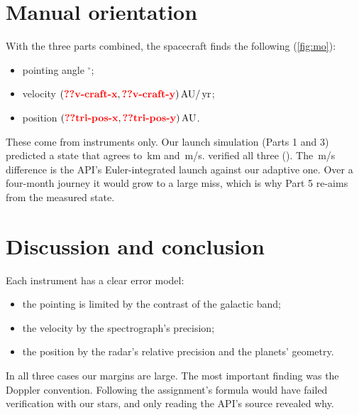 \documentclass[aps,prd,twocolumn,nofootinbib,floatfix,superscriptaddress]{revtex4-2}
\begin{document}

\section{Manual orientation}
With the three parts combined, the spacecraft finds the following (\cref{fig:mo}):
\begin{itemize}
\item pointing angle $^\circ$;
\item velocity $(\val{v-craft-x},\val{v-craft-y})\AU/\yr$;
\item position $(\val{tri-pos-x},\val{tri-pos-y})\AU$.
\end{itemize}
These come from instruments only.
Our launch simulation (Parts 1 and 3) predicted a state that agrees to \,km and \,m/s.
 verified all three ().
The \,m/s difference is the API's Euler-integrated launch against our adaptive one.
Over a four-month journey it would grow to a large miss, which is why Part 5 re-aims from the measured state.


\section{Discussion and conclusion}
Each instrument has a clear error model:
\begin{itemize}
\item the pointing is limited by the contrast of the galactic band;
\item the velocity by the spectrograph's precision;
\item the position by the radar's relative precision and the planets' geometry.
\end{itemize}
In all three cases our margins are large.
The most important finding was the Doppler convention.
Following the assignment's formula would have failed verification with our stars, and only reading the API's source revealed why.
\end{document}
